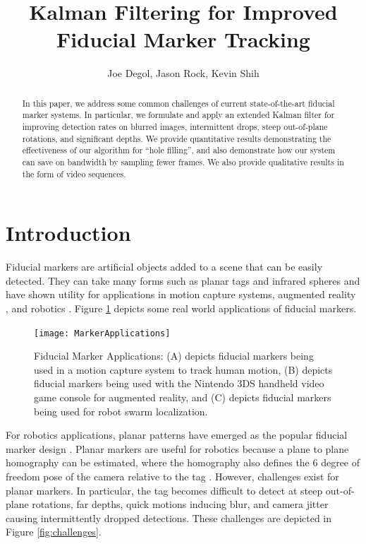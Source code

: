 \documentclass[letterpaper,10pt,conference]{IEEEtran}
\title{Kalman Filtering for Improved Fiducial Marker Tracking}
\author{Joe Degol, Jason Rock, Kevin Shih}
\begin{document}
\maketitle
\thispagestyle{empty}
\pagestyle{empty}



\begin{abstract}
In this paper, we address some common challenges of current state-of-the-art fiducial marker systems. In particular, we formulate and apply an extended Kalman filter for improving detection rates on blurred images, intermittent drops, steep out-of-plane rotations, and significant depths. We provide quantitative results demonstrating the effectiveness of our algorithm for ``hole filling'', and also demonstrate how our system can save on bandwidth by sampling fewer frames. We also provide qualitative results in the form of video sequences.
\end{abstract}



\section{Introduction}
Fiducial markers are artificial objects added to a scene that can be easily detected. They can take many forms such as planar tags and infrared spheres and have shown utility for applications in motion capture systems, augmented reality \cite{Fiala2005}\cite{Fiala2010}, and robotics \cite{Olson2011}. Figure \ref{fig:applications} depicts some real world applications of fiducial markers.

\begin{figure}
\centering
\texttt{[image: MarkerApplications]}
\caption{Fiducial Marker Applications: (A) depicts fiducial markers being used in a motion capture system to track human motion, (B) depicts fiducial markers being used with the Nintendo 3DS handheld video game console for augmented reality, and (C) depicts fiducial markers being used for robot swarm localization.}
\label{fig:applications}
\end{figure}

For robotics applications, planar patterns have emerged as the popular fiducial marker design \cite{Sattar2007,Olson2011}. Planar markers are useful for robotics because a plane to plane homography can be estimated, where the homography also defines the 6 degree of freedom pose of the camera relative to the tag \cite{Olson2011}. However, challenges exist for planar markers. In particular, the tag becomes difficult to detect at steep out-of-plane rotations, far depths, quick motions inducing blur, and camera jitter causing intermittently dropped detections. These challenges are depicted in Figure \ref{fig:challenges}.
\end{document}

